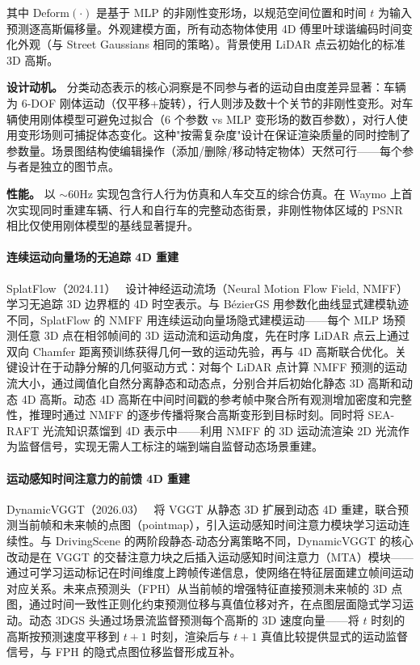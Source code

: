 其中 $\text{Deform}(\cdot)$ 是基于 MLP 的非刚性变形场，以规范空间位置和时间 $t$ 为输入预测逐高斯偏移量。外观建模方面，所有动态物体使用 4D 傅里叶球谐编码时间变化外观（与 Street Gaussians 相同的策略）。背景使用 LiDAR 点云初始化的标准 3D 高斯。

\textbf{设计动机。} 分类动态表示的核心洞察是不同参与者的运动自由度差异显著：车辆为 6-DOF 刚体运动（仅平移+旋转），行人则涉及数十个关节的非刚性变形。对车辆使用刚体模型可避免过拟合（6 个参数 vs MLP 变形场的数百参数），对行人使用变形场则可捕捉体态变化。这种"按需复杂度"设计在保证渲染质量的同时控制了参数量。场景图结构使编辑操作（添加/删除/移动特定物体）天然可行——每个参与者是独立的图节点。

\textbf{性能。} 以 $\sim$60Hz 实现包含行人行为仿真和人车交互的综合仿真。在 Waymo 上首次实现同时重建车辆、行人和自行车的完整动态街景，非刚性物体区域的 PSNR 相比仅使用刚体模型的基线显著提升。

\paragraph{连续运动向量场的无追踪 4D 重建}

SplatFlow（2024.11）~\cite{2411_15482} 设计神经运动流场（Neural Motion Flow Field, NMFF）学习无追踪 3D 边界框的 4D 时空表示。与 B\'ezierGS 用参数化曲线显式建模轨迹不同，SplatFlow 的 NMFF 用连续运动向量场隐式建模运动——每个 MLP 场预测任意 3D 点在相邻帧间的 3D 运动流和运动角度，先在时序 LiDAR 点云上通过双向 Chamfer 距离预训练获得几何一致的运动先验，再与 4D 高斯联合优化。关键设计在于动静分解的几何驱动方式：对每个 LiDAR 点计算 NMFF 预测的运动流大小，通过阈值化自然分离静态和动态点，分别合并后初始化静态 3D 高斯和动态 4D 高斯。动态 4D 高斯在中间时间戳的参考帧中聚合所有观测增加密度和完整性，推理时通过 NMFF 的逐步传播将聚合高斯变形到目标时刻。同时将 SEA-RAFT 光流知识蒸馏到 4D 表示中——利用 NMFF 的 3D 运动流渲染 2D 光流作为监督信号，实现无需人工标注的端到端自监督动态场景重建。

\paragraph{运动感知时间注意力的前馈 4D 重建}

DynamicVGGT（2026.03）~\cite{2603_08254} 将 VGGT 从静态 3D 扩展到动态 4D 重建，联合预测当前帧和未来帧的点图（pointmap），引入运动感知时间注意力模块学习运动连续性。与 DrivingScene 的两阶段静态-动态分离策略不同，DynamicVGGT 的核心改动是在 VGGT 的交替注意力块之后插入运动感知时间注意力（MTA）模块——通过可学习运动标记在时间维度上跨帧传递信息，使网络在特征层面建立帧间运动对应关系。未来点预测头（FPH）从当前帧的增强特征直接预测未来帧的 3D 点图，通过时间一致性正则化约束预测位移与真值位移对齐，在点图层面隐式学习运动。动态 3DGS 头通过场景流监督预测每个高斯的 3D 速度向量——将 $t$ 时刻的高斯按预测速度平移到 $t+1$ 时刻，渲染后与 $t+1$ 真值比较提供显式的运动监督信号，与 FPH 的隐式点图位移监督形成互补。

